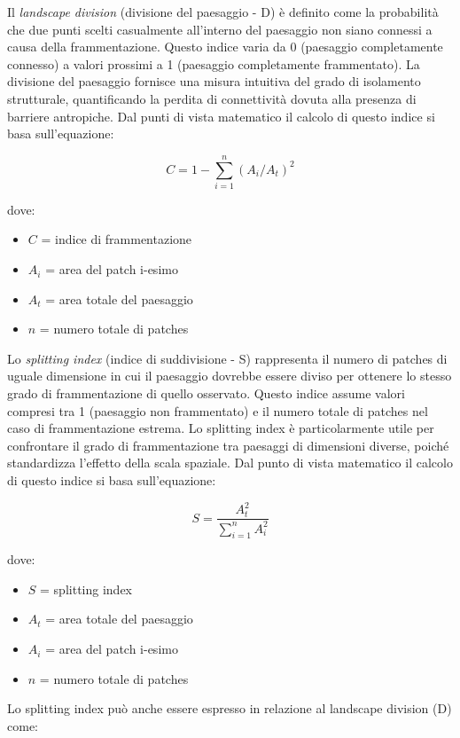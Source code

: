 \documentclass[
]{book}
\providecommand{\tightlist}{%
  \setlength{\itemsep}{0pt}\setlength{\parskip}{0pt}}
\begin{document}
Il \emph{landscape division} (divisione del paesaggio - D) è definito come la probabilità che due punti scelti casualmente all'interno del paesaggio non siano connessi a causa della frammentazione.
Questo indice varia da 0 (paesaggio completamente connesso) a valori prossimi a 1 (paesaggio completamente frammentato).
La divisione del paesaggio fornisce una misura intuitiva del grado di isolamento strutturale, quantificando la perdita di connettività dovuta alla presenza di barriere antropiche.
Dal punti di vista matematico il calcolo di questo indice si basa sull'equazione:

\[C=1-\sum_{i=1}^{n}(A_i/A_t)^2\]

dove:

\begin{itemize}
\tightlist
\item
  \(C\) = indice di frammentazione
\item
  \(A_i\) = area del patch i-esimo
\item
  \(A_t\) = area totale del paesaggio
\item
  \(n\) = numero totale di patches
\end{itemize}

Lo \emph{splitting index} (indice di suddivisione - S) rappresenta il numero di patches di uguale dimensione in cui il paesaggio dovrebbe essere diviso per ottenere lo stesso grado di frammentazione di quello osservato.
Questo indice assume valori compresi tra 1 (paesaggio non frammentato) e il numero totale di patches nel caso di frammentazione estrema.
Lo splitting index è particolarmente utile per confrontare il grado di frammentazione tra paesaggi di dimensioni diverse, poiché standardizza l'effetto della scala spaziale.
Dal punto di vista matematico il calcolo di questo indice si basa sull'equazione:

\[S=\frac{A_{t}^{2}}{\sum_{i=1}^{n}A_i^2}\]

dove:

\begin{itemize}
\tightlist
\item
  \(S\) = splitting index
\item
  \(A_t\) = area totale del paesaggio
\item
  \(A_i\) = area del patch i-esimo
\item
  \(n\) = numero totale di patches
\end{itemize}

Lo splitting index può anche essere espresso in relazione al landscape division (D) come:
\end{document}
